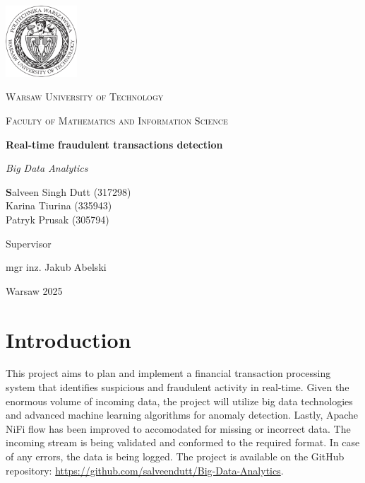 \documentclass[12pt,a4paper, hidelinks]{article}
\begin{document}
\begin{titlepage}
    \centering
    \vspace*{0.5 cm}
    \includegraphics[width=0.20\textwidth]{images/logo.png}\par\vspace{1cm}
    {\scshape\LARGE Warsaw University of Technology \par}
    \vspace{1cm}
    {\scshape\Large Faculty of Mathematics and Information Science\par}
    \vspace{1.5cm}
    {\huge\bfseries Real-time fraudulent transactions detection \par}
    \vspace{1cm}
    {\Large\itshape Big Data Analytics\par}
    \vfill
    \begin{flushright}

    {\Large\textbf Salveen Singh Dutt (317298) \\ Karina Tiurina (335943)  \\ Patryk Prusak (305794) \par}
    \vfill
    {Supervisor\par}
    {\Large mgr inz. Jakub Abelski \par}
    
    \end{flushright}
    \vfill
    {\large Warsaw 2025\par}
    \vspace{1cm}
\end{titlepage}

\newpage

\tableofcontents
\newpage %

\section*{Introduction}

This project aims to plan and implement a financial transaction processing system that identifies suspicious and fraudulent activity in real-time. Given the enormous volume of incoming data, the project will utilize big data technologies and advanced machine learning algorithms for anomaly detection. Lastly, Apache NiFi flow has been improved to accomodated for missing or incorrect data. The incoming stream is being validated and conformed to the required format. In case of any errors, the data is being logged. The project is available on the GitHub repository: \href{https://github.com/salveendutt/Big-Data-Analytics}{https://github.com/salveendutt/Big-Data-Analytics}.
\end{document}

